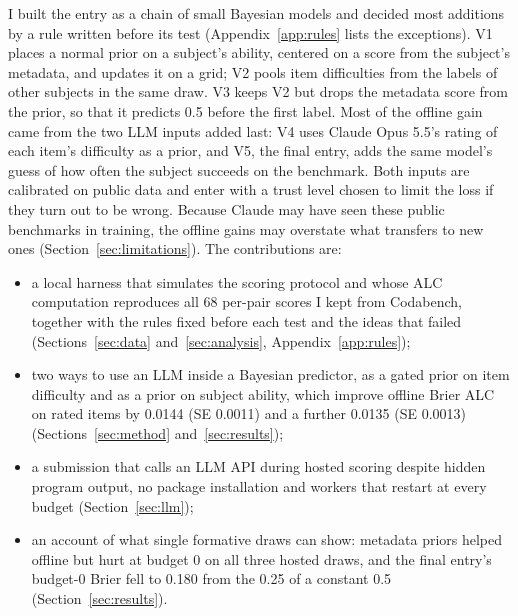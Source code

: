 I built the entry as a chain of small Bayesian models and decided most additions by a rule written before its test (Appendix~\ref{app:rules} lists the exceptions). V1 places a normal prior on a subject's ability, centered on a score from the subject's metadata, and updates it on a grid; V2 pools item difficulties from the labels of other subjects in the same draw. V3 keeps V2 but drops the metadata score from the prior, so that it predicts 0.5 before the first label. Most of the offline gain came from the two LLM inputs added last: V4 uses Claude Opus 5.5's rating of each item's difficulty as a prior, and V5, the final entry, adds the same model's guess of how often the subject succeeds on the benchmark. Both inputs are calibrated on public data and enter with a trust level chosen to limit the loss if they turn out to be wrong. Because Claude may have seen these public benchmarks in training, the offline gains may overstate what transfers to new ones (Section~\ref{sec:limitations}). The contributions are:
\begin{itemize}
  \item a local harness that simulates the scoring protocol and whose ALC computation reproduces all 68 per-pair scores I kept from Codabench, together with the rules fixed before each test and the ideas that failed (Sections~\ref{sec:data} and~\ref{sec:analysis}, Appendix~\ref{app:rules});
  \item two ways to use an LLM inside a Bayesian predictor, as a gated prior on item difficulty and as a prior on subject ability, which improve offline Brier ALC on rated items by 0.0144 (SE 0.0011) and a further 0.0135 (SE 0.0013) (Sections~\ref{sec:method} and~\ref{sec:results});
  \item a submission that calls an LLM API during hosted scoring despite hidden program output, no package installation and workers that restart at every budget (Section~\ref{sec:llm});
  \item an account of what single formative draws can show: metadata priors helped offline but hurt at budget 0 on all three hosted draws, and the final entry's budget-0 Brier fell to 0.180 from the 0.25 of a constant 0.5 (Section~\ref{sec:results}).
\end{itemize}
